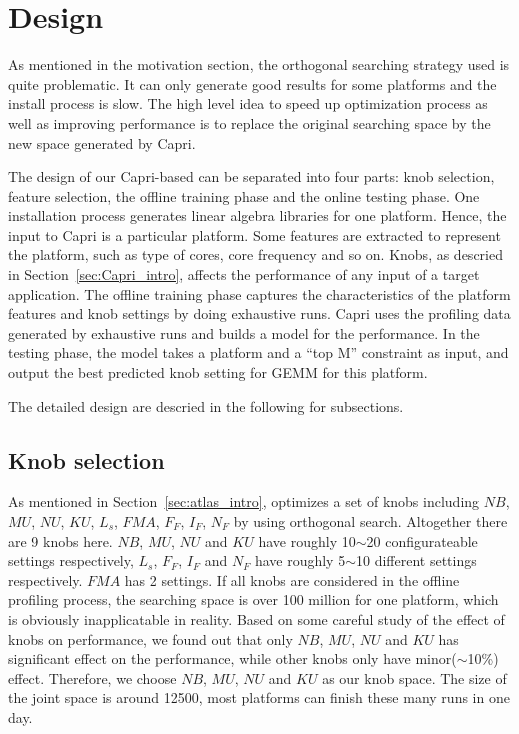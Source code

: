 \section{Design}
\label{sec:design}

As mentioned in the motivation section, the orthogonal searching strategy used
\atl is quite problematic. It can only generate good results for some platforms
and the install process is slow. The high level idea to speed up \atl
optimization process as well as improving \gem performance is to replace the
original searching space by the new space generated by Capri.

The design of our Capri-based \atl can be separated into four parts: knob
selection, feature selection, the offline training phase and the online testing
phase. One \atl installation process generates linear algebra libraries for one
platform. Hence, the input to Capri is a particular platform. Some features are
extracted to represent the platform, such as type of cores, core frequency and
so on. Knobs, as descried in Section~\ref{sec:Capri_intro}, affects the
performance of any input of a target application. The offline training phase
captures the characteristics of the platform features and knob settings by doing
exhaustive runs. Capri uses the profiling data generated by exhaustive runs and
builds a model for the \gem performance. In the testing phase, the model takes
a platform and a ``top M'' constraint as input, and output the best predicted
knob setting for GEMM for this platform.

The detailed design are descried in the following for subsections.

  \subsection{Knob selection}
  \label{sec:knobs}
  As mentioned in Section~\ref{sec:atlas_intro}, \atl optimizes a set of knobs
  including {$NB$, $MU$, $NU$, $KU$, $L_s$, $FMA$, $F_F$, $I_F$, $N_F$} by
  using orthogonal search. Altogether there are 9 knobs here. $NB$, $MU$, $NU$
  and $KU$ have roughly 10$\sim$20 configurateable settings respectively, $L_s$,
  $F_F$, $I_F$ and $N_F$ have roughly 5$\sim$10 different settings respectively.
  $FMA$ has 2 settings. If all knobs are considered in the offline profiling
  process, the searching space is over 100 million for one platform, which is
  obviously inapplicatable in reality. Based on some careful study of the
  effect of knobs on \gem performance, we found out that only $NB$, $MU$, $NU$
  and $KU$ has significant effect on the performance, while other knobs only
  have minor($\sim$10\%) effect. Therefore, we choose $NB$, $MU$, $NU$ and $KU$
  as our knob space. The size of the joint space is around 12500, most
  platforms can finish these many runs in one day.

